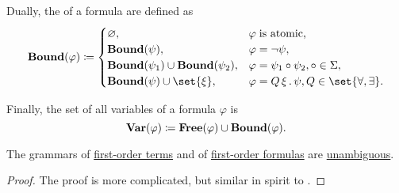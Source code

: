 \begin{definition}
\begin{thmenum}
     Dually, the  of a formula are defined as
    \begin{equation}\label{eq:def:first_order_syntax/formula_bound_variables}
      \boldop{Bound}(\varphi) \coloneqq \begin{cases}
        \varnothing,                                        &\varphi \T{is atomic,} \\
        \boldop{Bound}(\psi),                               &\varphi = \neg \psi, \\
        \boldop{Bound}(\psi_1) \cup \boldop{Bound}(\psi_2), &\varphi = \psi_1 \bincirc \psi_2, \bincirc \in \Sigma, \\
        \boldop{Bound}(\psi) \cup \set{ \xi },              &\varphi = \quantifier{Q}{\xi} \psi, Q \in \set{ \forall, \exists }.
      \end{cases}
    \end{equation}

     Finally, the set of all variables of a formula \( \varphi \) is
    \begin{equation}\label{eq:def:first_order_syntax/formula_variables}
      \operatorname{\mathbf{Var}}(\varphi) \coloneqq \operatorname{\mathbf{Free}}(\varphi) \cup \operatorname{\mathbf{Bound}}(\varphi).
    \end{equation}
  \end{thmenum}
\end{definition}

\begin{proposition}\label{thm:first_order_terms_and_formulas_are_unambiguous}
  The grammars of \hyperref[def:first_order_syntax/term]{first-order terms} and of \hyperref[def:first_order_syntax/formula]{first-order formulas} are \hyperref[def:grammar_derivation/unambiguous]{unambiguous}.
\end{proposition}
\begin{proof}
  The proof is more complicated, but similar in spirit to .
\end{proof}

